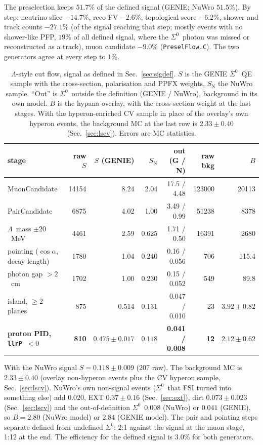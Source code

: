 \documentclass[11pt,a4paper]{article}
\newcommand{\Szero}{\ensuremath{\Sigma^{0}}}
\newcommand{\Lam}{\ensuremath{\Lambda}}
\begin{document}
The preselection keeps $51.7\%$ of the defined signal (GENIE; NuWro $51.5\%$). By step: neutrino
slice $-14.7\%$, reco FV $-2.6\%$, topological score $-6.2\%$, shower and track counts
$-27.1\%$ (of the signal reaching that step; mostly events with no shower-like PFP, $19\%$ of
all defined signal, where the \Szero\ photon was missed or reconstructed as a track), muon
candidate $-9.0\%$ (\texttt{PreselFlow.C}). The two generators agree at every step to $1\%$.

\begin{table}[h]\centering
\caption{\Lam-style cut flow, signal as defined in Sec.~\ref{sec:sigdef}. $S$ is the GENIE
\Szero\ QE sample with the cross-section, polarisation and PPFX weights, $S_{\mathrm{N}}$ the
NuWro sample. ``Out'' is \Szero\ outside the definition (GENIE / NuWro), background in its own
model. $B$ is the hypana overlay, with the cross-section weight at the last stages. With the
hyperon-enriched CV sample in place of the overlay's own hyperon events, the background MC at
the last row is $2.33\pm0.40$ (Sec.~\ref{sec:lscv}). Errors are MC statistics.}
\label{tab:lscutflow}
\small
\begin{tabular}{lrrrrrr}
\toprule
stage & raw $S$ & $S$ (GENIE) & $S_{\mathrm{N}}$ & out (G / N) & raw bkg & $B$ \\
\midrule
MuonCandidate             & 14154 & 8.24 & 2.04 & 17.5 / 4.48 & 123000 & 20113 \\
PairCandidate             &  6875 & 4.02 & 1.00 & 3.49 / 0.99 &  51238 &  8378 \\
\Lam\ mass $\pm20$~MeV    &  4461 & 2.59 & 0.625 & 1.71 / 0.50 &  16391 &  2680 \\
pointing ($\cos\alpha$, decay length) & 1780 & 1.04 & 0.240 & 0.16 / 0.056 & 706 & 115.4 \\
photon gap $>2$~cm        &  1702 & 1.00 & 0.230 & 0.15 / 0.052 &    549 &  89.8 \\
island, $\geq2$ planes    &   875 & 0.514 & 0.131 & 0.047 / 0.010 &     23 & $3.92\pm0.82$ \\
\textbf{proton PID, \texttt{llrP}~$<0$} & \textbf{810} & $\mathbf{0.475\pm0.017}$ & $\mathbf{0.118}$ & \textbf{0.041 / 0.008} & \textbf{12} & $\mathbf{2.12\pm0.62}$ \\
\bottomrule
\end{tabular}
\end{table}

\noindent With the NuWro signal $S=0.118\pm0.009$ (207 raw). The background MC is
$2.33\pm0.40$ (overlay non-hyperon events plus the CV hyperon sample, Sec.~\ref{sec:lscv}).
NuWro's own non-signal events (\Szero\ that FSI turned into something else) add $0.020$, EXT
$0.37\pm0.16$ (Sec.~\ref{sec:ext}), dirt $0.073\pm0.023$ (Sec.~\ref{sec:lscv}) and the
out-of-definition \Szero\ $0.008$ (NuWro) or $0.041$ (GENIE), so $B=2.80$ (NuWro model) or
$2.84$ (GENIE model). The pair and pointing steps separate defined
from undefined \Szero: 2:1 against the signal at the muon stage, 1:12 at the end. The
efficiency for the defined signal is $3.0\%$ for both generators.
\end{document}
